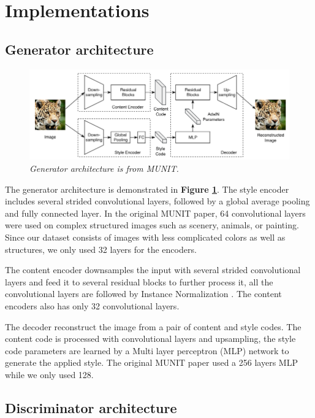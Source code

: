 \documentclass[12pt]{report}
\begin{document}
\section{Implementations}
\subsection{Generator architecture}
\begin{figure}[h]
	\centering
	\includegraphics[scale=0.8]{gen-architecture}
	\caption{\textit{Generator architecture is from MUNIT\cite{munit}.}}
	\label{fig:gen-architecture}
\end{figure}
The generator architecture is demonstrated in \textbf{Figure \ref{fig:gen-architecture}}. The style encoder includes several strided convolutional layers, followed by a global average pooling and fully connected layer. In the original MUNIT paper\cite{munit}, 64 convolutional layers were used on complex structured images such as scenery, animals, or painting. Since our dataset consists of images with less complicated colors as well as structures, we only used 32 layers for the encoders.

The content encoder downsamples the input with several strided convolutional layers and feed it to several residual blocks \cite{resnet} to further process it, all the convolutional layers are followed by Instance Normalization \cite{instance-norm}. The content encoders also has only 32 convolutional layers.

The decoder reconstruct the image from a pair of content and style codes. The content code is processed with convolutional layers and upsampling, the style code parameters are learned by a Multi layer perceptron (MLP) \cite{mlp} network to generate the applied style. The original MUNIT paper\cite{munit} used a 256 layers MLP while we only used 128.


\subsection{Discriminator architecture}
\end{document}
